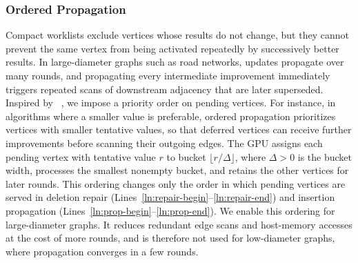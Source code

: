 \subsubsection{Ordered Propagation}
\label{sec:ordered-propagation}
\label{sec:workload-cost}
Compact worklists exclude vertices whose results do not change, but they cannot prevent the same vertex from being activated repeatedly by successively better results. In large-diameter graphs such as road networks, updates propagate over many rounds, and propagating every intermediate improvement immediately triggers repeated scans of downstream adjacency that are later superseded. Inspired by ~\cite{2014-bucket}, we impose a priority order on pending vertices. For instance, in algorithms where a smaller value is preferable, ordered propagation prioritizes vertices with smaller tentative values, so that deferred vertices can receive further improvements before scanning their outgoing edges. The GPU assigns each pending vertex with tentative value $r$ to bucket $\lfloor r/\Delta\rfloor$, where $\Delta>0$ is the bucket width, processes the smallest nonempty bucket, and retains the other vertices for later rounds. This ordering changes only the order in which pending vertices are served in deletion repair (Lines~\ref{ln:repair-begin}--\ref{ln:repair-end}) and insertion propagation (Lines~\ref{ln:prop-begin}--\ref{ln:prop-end}). We enable this ordering for large-diameter graphs. It reduces redundant edge scans and host-memory accesses at the cost of more rounds, and is therefore not used for low-diameter graphs, where propagation converges in a few rounds.
